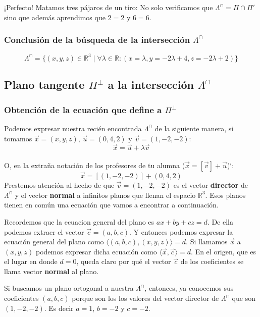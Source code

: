 \documentclass[10pt,a4paper]{article}
\begin{document}
¡Perfecto! Matamos tres pájaros de un tiro: No solo verificamos que $\Lambda^\cap = \Pi \cap \Pi'$ sino que
además aprendimos que $2=2$ y $6=6$.


\subsubsection{Conclusión de la búsqueda de la intersección $\Lambda^\cap$}


$$\Lambda^\cap =
  \{
  (x,y,z) \in  \mathbb{R}^3 \mid \forall \lambda \in \mathbb{R}: (
  x = \lambda,
  y = -2\lambda + 4,
  z = -2\lambda+2 )
  \}
$$


\subsection{Plano tangente $\Pi^\perp$ a la intersección $\Lambda^\cap$}


\subsubsection{Obtención de la ecuación que define a $\Pi^\perp$}


Podemos expresar nuestra recién encontrada $\Lambda^\cap$ de la siguiente manera,
si tomamos
$\vec{x} = (x, y, z)$,
$\vec{u} = (0,4,2)$ y
$\vec{v} = (1,-2,-2)$:
$$\vec{x} = \vec{u} + \lambda\vec{v}$$\\
O, en la extraña notación de los profesores de tu alumna ($\vec{x} = [\vec{v}] + \vec{u}$)`:
$$
  \vec{x} = [(1,-2,-2)] + (0,4,2)
$$
Prestemos atención al hecho de que $\vec{v} = (1,-2,-2)$
es el vector \textbf{director} de $\Lambda^\cap$ y el vector \textbf{normal} a
infinitos planos que llenan el espacio $\mathbb{R}^3$.
Esos planos tienen en común una ecuación que vamos a encontrar a continuación.

Recordemos que la ecuacion general del plano es $ax+by+cz=d$. De ella podemos extraer el vector $\vec{c} = (a,b,c)$. Y entonces podemos
expresar la ecuación general del plano como $\langle(a,b,c),(x,y,z)\rangle = d$. Si llamamos $\vec{x}$ a $(x,y,z)$ podemos expresar dicha ecuación
como $\langle\vec{x},\vec{c}\rangle = d$. En el origen, que es el lugar en donde $d=0$, queda claro por qué el vector $\vec{c}$ de los coeficientes se
llama vector \textbf{normal} al plano.

Si buscamos un plano ortogonal a nuestra $\Lambda^\cap$, entonces, ya conocemos sus coeficientes $(a,b,c)$ porque son los los valores del
vector director de $\Lambda^\cap$ que son  $(1,-2,-2)$. Es decir $a=1$, $b=-2$ y $c=-2$.
\end{document}
